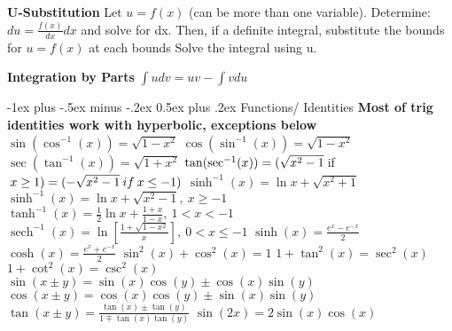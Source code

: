 \documentclass[10pt,a4paper,landscape]{article}
\makeatletter
\DeclareMathOperator{\sech}{sech}
\renewcommand{\section}{\@startsection{section}{1}{0mm}%
{-1ex plus -.5ex minus -.2ex}%
{0.5ex plus .2ex}%
{\normalfont\large\bfseries}}
\makeatother
\begin{document}
\begin{multicols*}{5}
	\textbf{U-Substitution}\newline
	Let $ u=f(x) $ (can be more than one variable).\newline
	Determine: $ du = \frac{f(x)}{dx}dx $ and solve for dx.\newline
	Then, if a definite integral, substitute the bounds for $ u=f(x) $ at each bounds\newline
	Solve the integral using u.\newline

	\textbf{Integration by Parts}\newline
	$ \int u dv = uv-\int v du $

	\section{Functions/ Identities}
	\textbf{Most of trig identities work with hyperbolic, exceptions below}\newline  
	$\sin(\cos^{-1}(x)) = \sqrt{1-x^2}$\newline
	$\cos(\sin^{-1}(x)) = \sqrt{1-x^2} $\newline
	$\sec(\tan^{-1}(x)) = \sqrt{1+x^2} $\newline
	$\tan(\sec^{-1}(x)) \newline = (\sqrt{x^2-1} \: $if$ \: x \ge 1)\newline =(-\sqrt{x^2-1} \: if \: x \le -1)$
	$\sinh^{-1}(x) = \ln{x+\sqrt{x^2+1}} $\newline
	$\sinh^{-1}(x) = \ln{x+\sqrt{x^2-1}}, \: x \ge -1 $\newline
	$\tanh^{-1}(x) = \frac{1}{2}\ln{x+\frac{1+x}{1-x}}, \: 1 < x < -1 $\newline
	$\sech^{-1}(x) = \ln[{\frac{1+\sqrt{1-x^2}}{x}}], \: 0 < x \le -1 $\newline
	$\sinh(x) = \frac{e^{x}-e^{-x}}{2} $\newline
	$\cosh(x) = \frac{e^{x}+e^{-x}}{2} $\newline
	$ \sin^2(x)+\cos^2(x) = 1 $\newline
	$ 1+\tan^2(x) = \sec^2(x) $\newline
	$ 1+\cot^2(x) = \csc^2(x) $\newline
	$ \sin(x\pm y) = \sin(x)\cos(y)\pm\cos(x)\sin(y) $\newline
	$ \cos(x\pm y) = \cos(x)\cos(y)\pm\sin(x)\sin(y) $\newline
	$ \tan(x\pm y) = \frac{\tan(x)\pm\tan(y)}{1 \mp \tan(x)\tan(y)} $\newline
	$ \sin(2x) = 2\sin(x)\cos(x) $\newline

\end{multicols*}
\end{document}
